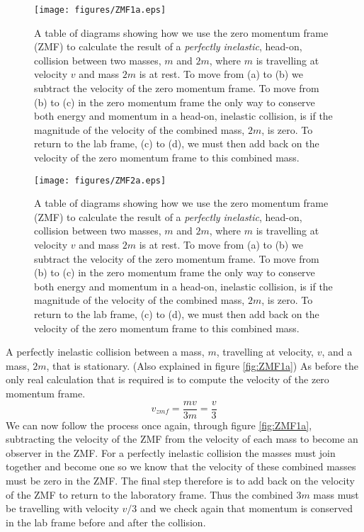 \begin{wrapfigure}{r}{9.0cm}
\texttt{[image: figures/ZMF1a.eps]}
\caption{A table of diagrams showing how we use the zero momentum frame (ZMF) to calculate the result of a {\it perfectly inelastic}, head-on, collision between two masses, $m$ and $2m$, where $m$ is travelling at velocity $v$ and mass $2m$ is at rest.  To move from (a) to (b) we subtract the velocity of the zero momentum frame.  To move from (b) to (c) in the zero momentum frame the only way to conserve both energy and momentum in a head-on, inelastic collision, is if the magnitude of the velocity of the combined mass, $2m$, is zero.  To return to the lab frame, (c) to (d), we must then add back on the velocity of the zero momentum frame to this combined mass.}\vspace{1.5cm}
\label{fig:ZMF1a}
\texttt{[image: figures/ZMF2a.eps]}
\caption{A table of diagrams showing how we use the zero momentum frame (ZMF) to calculate the result of a {\it perfectly inelastic}, head-on, collision between two masses, $m$ and $2m$, where $m$ is travelling at velocity $v$ and mass $2m$ is at rest.  To move from (a) to (b) we subtract the velocity of the zero momentum frame.  To move from (b) to (c) in the zero momentum frame the only way to conserve both energy and momentum in a head-on, inelastic collision, is if the magnitude of the velocity of the combined mass, $2m$, is zero.  To return to the lab frame, (c) to (d), we must then add back on the velocity of the zero momentum frame to this combined mass.} \vspace{-1.0cm}
\label{fig:ZMF2a}
\end{wrapfigure}
 A perfectly inelastic collision between a mass, $m$, travelling at velocity, $v$, and a mass, $2m$, that is stationary. (Also explained in figure \ref{fig:ZMF1a})\nll
As before the only real calculation that is required is to compute the velocity of the zero momentum frame.
\begin{equation}
v_{zmf}=\frac{mv}{3m}=\frac{v}{3}
\end{equation}
We can now follow the process once again, through figure \ref{fig:ZMF1a}, subtracting the velocity of the ZMF from the velocity of each mass to become an observer in the ZMF.  For a perfectly inelastic collision the masses must join together and become one so we know that the velocity of these combined masses must be zero in the ZMF.  The final step therefore is to add back on the velocity of the ZMF to return to the laboratory frame.  Thus the combined $3m$ mass must be travelling with velocity $v/3$ and we check again that momentum is conserved in the lab frame before and after the collision.\\

